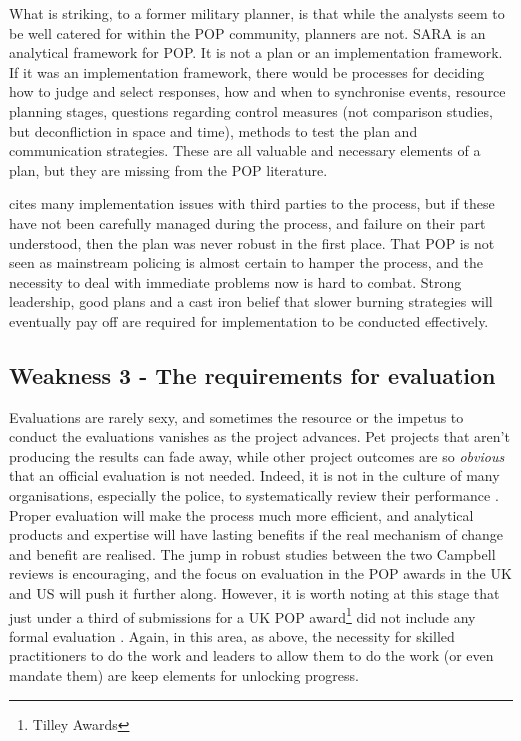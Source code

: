 What is striking, to a former military planner, is that while the analysts seem to be well catered for within the POP community, planners are not. SARA is an analytical framework for POP. It is not a plan or an implementation framework. If it was an implementation framework, there would be processes for deciding how to judge and select responses, how and when to synchronise events, resource planning stages, questions regarding control measures (not comparison studies, but deconfliction in space and time), methods to test the plan and communication strategies. These are all valuable and necessary elements of a plan, but they are missing from the POP literature. 

\parencite{hinkle2020problem} cites many implementation issues with third parties to the process, but if these have not been carefully managed during the process, and failure on their part understood, then the plan was never robust in the first place. That POP is not seen as mainstream policing is almost certain to hamper the process, and the necessity to deal with immediate problems now is hard to combat. Strong leadership, good plans and a cast iron belief that slower burning strategies will eventually pay off are required for implementation to be conducted effectively.

 
 \subsection{Weakness 3 - The requirements for evaluation}



Evaluations are rarely sexy, and sometimes the resource or the impetus to conduct the evaluations vanishes as the project advances. Pet projects that aren’t producing the results can fade away, while other project outcomes are so \emph{obvious} that an official evaluation is not needed. Indeed, it is not in the culture of many organisations, especially the police, to systematically review their performance \parencite{goldstein1990}. Proper evaluation will make the process much more efficient, and analytical products and expertise will have lasting benefits if the real mechanism of change and benefit are realised. The jump in robust studies between the two Campbell reviews is encouraging, and the focus on evaluation in the POP awards in the UK and US will push it further along. However, it is worth noting at this stage that just under a third of submissions for a UK POP award\footnote{Tilley Awards} did not include any formal evaluation \parencite{POPUCL}. Again, in this area, as above, the necessity for skilled practitioners to do the work and leaders to allow them to do the work (or even mandate them) are keep elements for unlocking progress.  

